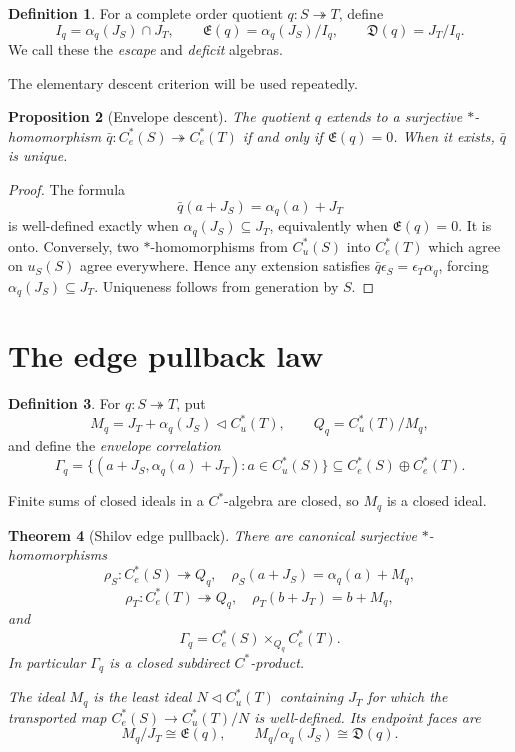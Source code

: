 \documentclass[11pt,a4paper]{amsart}
\theoremstyle{plain}
\newtheorem{theorem}{Theorem}[section]
\newtheorem{proposition}[theorem]{Proposition}
\theoremstyle{definition}
\newtheorem{definition}[theorem]{Definition}
\newcommand{\Cu}{C_u^*}
\newcommand{\Ce}{C_e^*}
\newcommand{\Esc}{\mathfrak E}
\newcommand{\Def}{\mathfrak D}
\begin{document}
\begin{definition}\label{def:exchange}
For a complete order quotient $q:S\twoheadrightarrow T$, define
\[
 I_q=\alpha_q(J_S)\cap J_T,\qquad
 \Esc(q)=\alpha_q(J_S)/I_q,\qquad
 \Def(q)=J_T/I_q.
\]
We call these the \emph{escape} and \emph{deficit} algebras.
\end{definition}

The elementary descent criterion will be used repeatedly.

\begin{proposition}[Envelope descent]\label{prop:descent}
The quotient $q$ extends to a surjective $*$-homomorphism
\(\bar q:\Ce(S)\twoheadrightarrow\Ce(T)\) if and only if $\Esc(q)=0$.
When it exists, $\bar q$ is unique.
\end{proposition}

\begin{proof}
The formula
\[
 \bar q(a+J_S)=\alpha_q(a)+J_T
\]
is well-defined exactly when $\alpha_q(J_S)\subseteq J_T$, equivalently when
$\Esc(q)=0$.  It is onto.  Conversely, two $*$-homomorphisms from $\Cu(S)$ into $\Ce(T)$
which agree on $u_S(S)$ agree everywhere.  Hence any extension satisfies
\(\bar q\epsilon_S=\epsilon_T\alpha_q\), forcing
\(\alpha_q(J_S)\subseteq J_T\).  Uniqueness follows from generation by $S$.
\end{proof}

\section{The edge pullback law}\label{sec:edge}

\begin{definition}\label{def:join-correlation}
For $q:S\twoheadrightarrow T$, put
\[
 M_q=J_T+\alpha_q(J_S)\triangleleft\Cu(T),\qquad
 Q_q=\Cu(T)/M_q,
\]
and define the \emph{envelope correlation}
\[
 \Gamma_q=
 \{(a+J_S,\alpha_q(a)+J_T):a\in\Cu(S)\}
 \subseteq\Ce(S)\oplus\Ce(T).
\]
\end{definition}

Finite sums of closed ideals in a $C^*$-algebra are closed, so $M_q$ is a closed ideal.

\begin{theorem}[Shilov edge pullback]\label{thm:pullback}
There are canonical surjective $*$-homomorphisms
\[
 \rho_S:\Ce(S)\twoheadrightarrow Q_q,\quad
 \rho_S(a+J_S)=\alpha_q(a)+M_q,
\]
\[
 \rho_T:\Ce(T)\twoheadrightarrow Q_q,\quad
 \rho_T(b+J_T)=b+M_q,
\]
and
\[
 \boxed{\Gamma_q=\Ce(S)\times_{Q_q}\Ce(T).}
\]
In particular $\Gamma_q$ is a closed subdirect $C^*$-product.

The ideal $M_q$ is the least ideal $N\triangleleft\Cu(T)$ containing $J_T$ for which the
transported map $\Ce(S)\to\Cu(T)/N$ is well-defined.  Its endpoint faces are
\[
 M_q/J_T\cong\Esc(q),\qquad
 M_q/\alpha_q(J_S)\cong\Def(q).
\]
\end{theorem}
\end{document}
